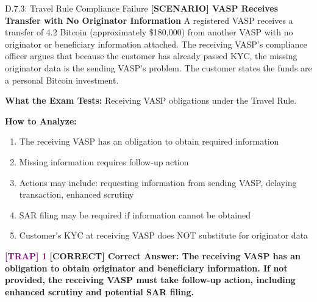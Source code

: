 \documentclass[11pt,a4paper]{beamer}
\newcommand{\trap}[1]{\textcolor{purple}{\textbf{[TRAP] 1}}}
\newcommand{\correct}[1]{\textcolor{green!50!black}{\textbf{[CORRECT] #1}}}
\newcommand{\scenario}[1]{\textcolor{blue!70!black}{\textbf{[SCENARIO] #1}}}
\begin{document}
\begin{frame}{D.7.3: Travel Rule Compliance Failure}
	\scenario{VASP Receives Transfer with No Originator Information}
	A registered VASP receives a transfer of 4.2 Bitcoin (approximately \$180,000) from another VASP with no originator or beneficiary information attached. The receiving VASP's compliance officer argues that because the customer has already passed KYC, the missing originator data is the sending VASP's problem. The customer states the funds are a personal Bitcoin investment.
	
	\vspace{0.1cm}
	\textbf{What the Exam Tests:} Receiving VASP obligations under the Travel Rule.
	
	\vspace{0.1cm}
	\textbf{How to Analyze:}
	\begin{enumerate}
		\item The receiving VASP has an obligation to obtain required information
		\item Missing information requires follow-up action
		\item Actions may include: requesting information from sending VASP, delaying transaction, enhanced scrutiny
		\item SAR filing may be required if information cannot be obtained
		\item Customer's KYC at receiving VASP does NOT substitute for originator data
	\end{enumerate}
	
	\trap{Common Distractor: "The Travel Rule imposes obligations only on the originating VASP."}
	\correct{Correct Answer: The receiving VASP has an obligation to obtain originator and beneficiary information. If not provided, the receiving VASP must take follow-up action, including enhanced scrutiny and potential SAR filing.}
\end{frame}

\end{document}
